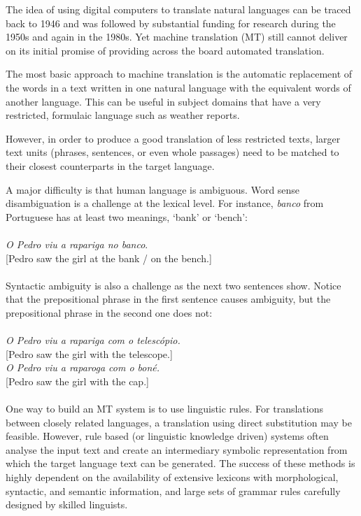 \begin{multicols}{2}
The idea of using digital computers to translate natural languages can be traced back to 1946 and was followed by substantial funding for research during the 1950s and again in the 1980s. 
Yet machine translation (MT) still cannot deliver on its initial promise of providing across the board automated translation.  

The most basic approach to machine translation is the automatic replacement of the words in a text written in one natural language with the equivalent words of another language. This can be useful in subject domains that have a very restricted, formulaic language such as weather reports.

However, in order to produce a good translation of less restricted texts, larger text units (phrases, sentences, or even whole passages) need to be matched to their closest counterparts in the target language.

A major difficulty is that human language is ambiguous. Word sense disambiguation is a challenge at the lexical level. 
For instance, \textit{banco} from Portuguese has at least two meanings, ‘bank’ or ‘bench’:\\
\\
\textit{O Pedro viu a rapariga no banco}.\\
{[}Pedro saw the girl at the bank / on the bench.{]}\\
\\
Syntactic ambiguity is also a challenge as the next two sentences show. Notice that the prepositional phrase in the first sentence causes ambiguity, but the prepositional phrase in the second one does not:\\
\\
\textit{O Pedro viu a rapariga com o telescópio.}\\
{[}Pedro saw the girl with the telescope.{]}\\
\textit{O Pedro viu a raparoga com o boné.}\\
{[}Pedro saw the girl with the cap.{]}\\
\\
One way to build an MT system is to use linguistic rules. For translations between closely related languages, a translation using direct substitution may be feasible. 
However, rule based (or linguistic knowledge driven) systems often analyse the input text and create an intermediary symbolic representation from which the target language text can be generated. The success of these methods is highly dependent on the availability of extensive lexicons with morphological, syntactic, and semantic information, and large sets of grammar rules carefully designed by skilled linguists.


\end{multicols}
